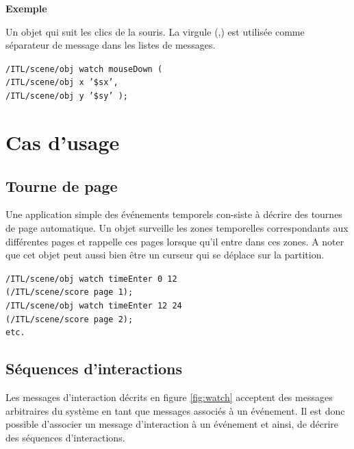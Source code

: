 \documentclass{article}
\newcommand{\sample}	[1]		{\begin{center}\colorbox{mygrey}{
								\begin{minipage}[t]{0.95\columnwidth} 
								{\small \texttt{#1}}
								\end{minipage}}\end{center}}
\newcounter{excount}
\newcommand{\exemple}			{\vspace{1mm} \hspace*{-4.5mm}\textbf{Exemple \arabic{excount}} \addtocounter{excount}{1}}
\begin{document}
\exemple   Un objet qui suit les clics de la souris. La virgule (,) est utilisée comme séparateur de message dans les listes de messages.
\sample{/ITL/scene/obj watch mouseDown (\\
\hspace*{12mm}/ITL/scene/obj x '\$sx', \\
\hspace*{12mm}/ITL/scene/obj y '\$sy' );}



\section{Cas d'usage}\label{sec:exemples}


\subsection{Tourne de page} \label{pageturn}

Une application simple des événements temporels con-siste à décrire des tournes de page automatique. Un objet surveille les zones temporelles correspondants aux différentes pages et rappelle ces pages lorsque qu'il entre dans ces zones. A noter que cet objet peut aussi bien être un curseur qui se déplace sur la partition.
\sample{/ITL/scene/obj watch timeEnter 0 12	\\
\hspace*{25mm}(/ITL/scene/score page 1);	\\
/ITL/scene/obj watch timeEnter 12 24	\\
\hspace*{25mm}(/ITL/scene/score page 2);	\\
\hspace*{1mm}etc.
}

\subsection{Séquences d'interactions} \label{seqitl}

Les messages d'interaction décrits en figure \ref{fig:watch} acceptent des messages arbitraires du système en tant que messages associés à un événement. Il est donc possible d'associer un message d'interaction à un événement et ainsi, de décrire des séquences d'interactions.
\end{document}
